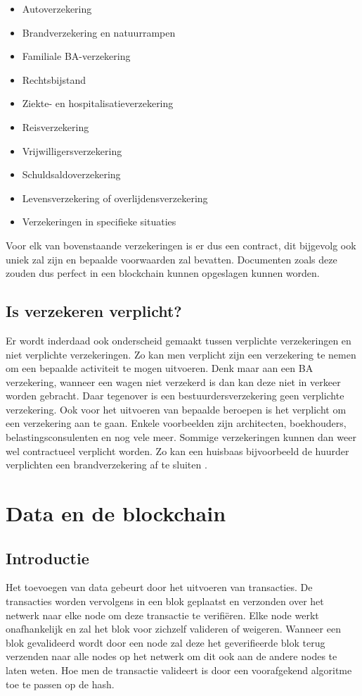 \begin{itemize}
	\item Autoverzekering
	\item Brandverzekering en natuurrampen
	\item Familiale BA-verzekering
	\item Rechtsbijstand
	\item Ziekte- en hospitalisatieverzekering
	\item Reisverzekering
	\item Vrijwilligersverzekering
	\item Schuldsaldoverzekering
	\item Levensverzekering of overlijdensverzekering
	\item Verzekeringen in specifieke situaties
\end{itemize}

Voor elk van bovenstaande verzekeringen is er dus een contract, dit bijgevolg ook uniek zal zijn en bepaalde voorwaarden zal bevatten. Documenten zoals deze zouden dus perfect in een blockchain kunnen opgeslagen kunnen worden. 

\section{Is verzekeren verplicht?}
Er wordt inderdaad ook onderscheid gemaakt tussen verplichte verzekeringen en niet verplichte verzekeringen. Zo kan men verplicht zijn een verzekering te nemen om een bepaalde activiteit te mogen uitvoeren. Denk maar aan een BA verzekering, wanneer een wagen niet verzekerd is dan kan deze niet in verkeer worden gebracht. Daar tegenover is een bestuurdersverzekering geen verplichte verzekering. Ook voor het uitvoeren van bepaalde beroepen is het verplicht om een verzekering aan te gaan. Enkele voorbeelden zijn architecten, boekhouders, belastingsconsulenten en nog vele meer. Sommige verzekeringen kunnen dan weer wel contractueel verplicht worden. Zo kan een huisbaas bijvoorbeeld de huurder verplichten een brandverzekering af te sluiten  \textcite{BFOverplichteVerzekeringen}. 

\chapter{Data en de blockchain}
\label{ch:add-to-blockchain}

\section{Introductie}
Het toevoegen van data gebeurt door het uitvoeren van transacties. De transacties worden vervolgens in een blok geplaatst en verzonden over het netwerk naar elke node om deze transactie te verifiëren. Elke node werkt onafhankelijk en zal het blok voor zichzelf valideren of weigeren. Wanneer een blok gevalideerd wordt door een node zal deze het geverifieerde blok terug verzenden naar alle nodes op het netwerk om dit ook aan de andere nodes te laten weten. Hoe men de transactie valideert is door een voorafgekend algoritme toe te passen op de hash. 

